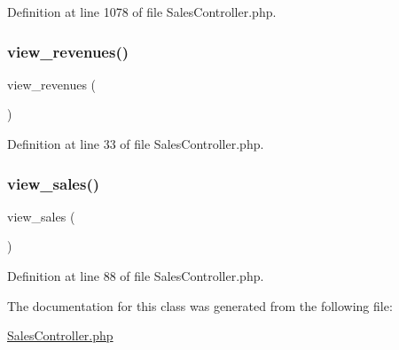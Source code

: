 Definition at line 1078 of file Sales\+Controller.\+php.

\mbox{\label{class_responsive_1_1_http_1_1_controllers_1_1_sales_controller_a6ab40143e21a521f539feafe14307097}} 
\subsubsection{\texorpdfstring{view\_revenues()}{view\_revenues()}}
{\footnotesize\ttfamily view\+\_\+revenues (\begin{DoxyParamCaption}{ }\end{DoxyParamCaption})}



Definition at line 33 of file Sales\+Controller.\+php.

\mbox{\label{class_responsive_1_1_http_1_1_controllers_1_1_sales_controller_a9c4ccb19926f4a518484fd42bb345272}} 
\subsubsection{\texorpdfstring{view\_sales()}{view\_sales()}}
{\footnotesize\ttfamily view\+\_\+sales (\begin{DoxyParamCaption}{ }\end{DoxyParamCaption})}



Definition at line 88 of file Sales\+Controller.\+php.



The documentation for this class was generated from the following file\+:\begin{DoxyCompactItemize}
\item 
\mbox{\hyperlink{_sales_controller_8php}{Sales\+Controller.\+php}}\end{DoxyCompactItemize}
